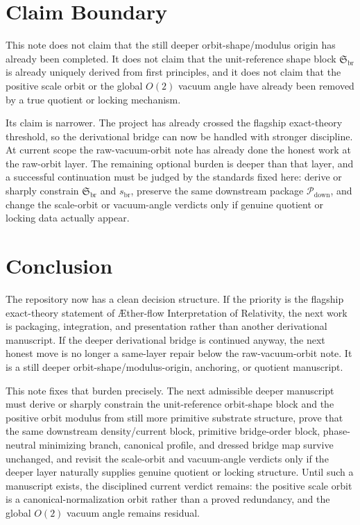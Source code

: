 \documentclass[11pt]{article}
\newcommand{\Aflow}{\AE{}ther-flow}
\newcommand{\TheoryName}{\Aflow{} Interpretation of Relativity}
\newcommand{\DownPkg}{\mathscr P_{\mathrm{down}}}
\newcommand{\ShapeTuple}{\mathfrak S_{\mathrm{br}}}
\newcommand{\ScaleMod}{s_{\mathrm{br}}}
\begin{document}
\section{Claim Boundary}

This note does not claim that the still deeper orbit-shape/modulus origin has already been completed. It does not claim that the unit-reference shape block \(\ShapeTuple\) is already uniquely derived from first principles, and it does not claim that the positive scale orbit or the global \(O(2)\) vacuum angle have already been removed by a true quotient or locking mechanism.

Its claim is narrower. The project has already crossed the flagship exact-theory threshold, so the derivational bridge can now be handled with stronger discipline. At current scope the raw-vacuum-orbit note has already done the honest work at the raw-orbit layer. The remaining optional burden is deeper than that layer, and a successful continuation must be judged by the standards fixed here: derive or sharply constrain \(\ShapeTuple\) and \(\ScaleMod\), preserve the same downstream package \(\DownPkg\), and change the scale-orbit or vacuum-angle verdicts only if genuine quotient or locking data actually appear.

\section{Conclusion}

The repository now has a clean decision structure. If the priority is the flagship exact-theory statement of \TheoryName{}, the next work is packaging, integration, and presentation rather than another derivational manuscript. If the deeper derivational bridge is continued anyway, the next honest move is no longer a same-layer repair below the raw-vacuum-orbit note. It is a still deeper orbit-shape/modulus-origin, anchoring, or quotient manuscript.

This note fixes that burden precisely. The next admissible deeper manuscript must derive or sharply constrain the unit-reference orbit-shape block and the positive orbit modulus from still more primitive substrate structure, prove that the same downstream density/current block, primitive bridge-order block, phase-neutral minimizing branch, canonical profile, and dressed bridge map survive unchanged, and revisit the scale-orbit and vacuum-angle verdicts only if the deeper layer naturally supplies genuine quotient or locking structure. Until such a manuscript exists, the disciplined current verdict remains: the positive scale orbit is a canonical-normalization orbit rather than a proved redundancy, and the global \(O(2)\) vacuum angle remains residual.
\end{document}
